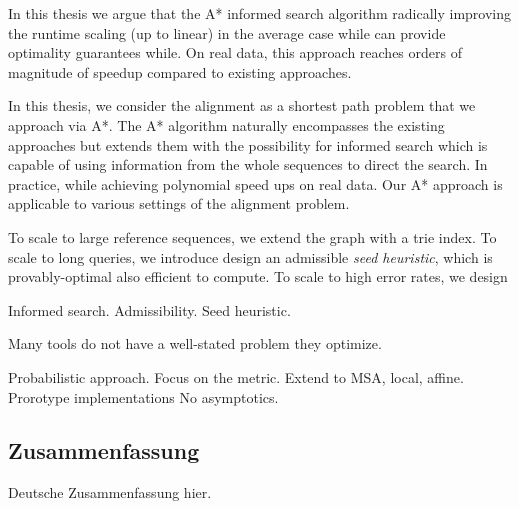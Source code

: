 In this thesis we argue that the
A* informed search algorithm radically improving the runtime scaling (up to
linear) in the average case while can provide optimality guarantees while. On
real data, this approach reaches orders of magnitude of speedup compared to
existing approaches.

In this thesis, we consider the alignment as a shortest path problem that we
approach via A*. The A* algorithm naturally encompasses the existing approaches
but extends them with the possibility for informed search which is capable of
using information from the whole sequences to direct the search. In practice,
while achieving polynomial speed ups on real data. Our A* approach is applicable
to various settings of the alignment problem.

To scale to large reference sequences, we extend the graph with a
trie index. To scale to long queries, we introduce design an admissible \emph{seed
heuristic}, which is provably-optimal also efficient to compute. To scale to
high error rates, we design  

Informed search. Admissibility. Seed heuristic.

Many tools do not have a well-stated problem they optimize.

Probabilistic approach.
Focus on the metric.
Extend to MSA, local, affine.
Prorotype implementations
No asymptotics.

\endgroup

\cleardoublepage%

\begingroup
\let\clearpage\relax
\let\cleardoublepage\relax
\let\cleardoublepage\relax

\begin{otherlanguage}{ngerman}
\chapter*{Zusammenfassung}

Deutsche Zusammenfassung hier.

\end{otherlanguage}

\endgroup

\vfill